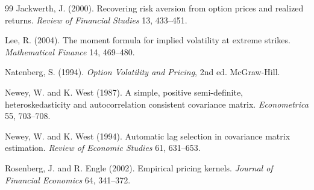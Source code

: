 \documentclass[11pt,a4paper]{article}
\theoremstyle{remark}
\begin{document}
\begin{thebibliography}{99}
Jackwerth, J. (2000). Recovering risk aversion from option prices and realized
returns. \emph{Review of Financial Studies} 13, 433--451.

Lee, R. (2004). The moment formula for implied volatility at extreme strikes.
\emph{Mathematical Finance} 14, 469--480.

Natenberg, S. (1994). \emph{Option Volatility and Pricing}, 2nd ed. McGraw-Hill.

Newey, W. and K. West (1987). A simple, positive semi-definite,
heteroskedasticity and autocorrelation consistent covariance matrix.
\emph{Econometrica} 55, 703--708.

Newey, W. and K. West (1994). Automatic lag selection in covariance matrix
estimation. \emph{Review of Economic Studies} 61, 631--653.

Rosenberg, J. and R. Engle (2002). Empirical pricing kernels. \emph{Journal of
Financial Economics} 64, 341--372.

\end{thebibliography}
\end{document}
